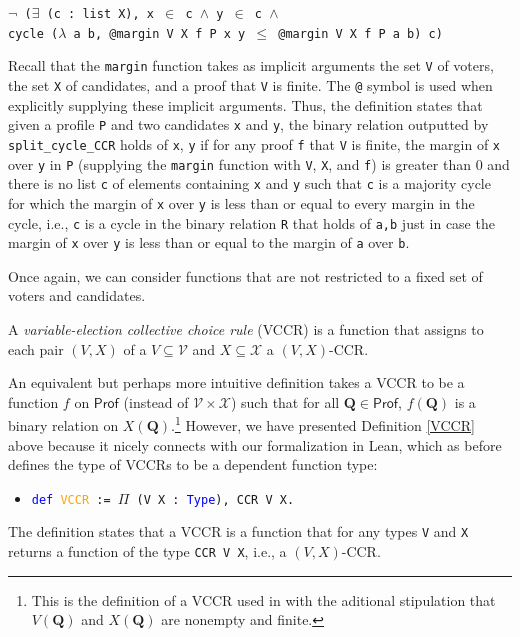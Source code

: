 \documentclass[runningheads]{llncs}
\begin{document}
\begin{example}
\begin{itemize}
    \texttt{$\neg$ ($\exists$ (c : list X), x $\in$ c $\wedge$ y $\in$ c $\wedge$}\\
    \texttt{cycle ($\lambda$ a b, @margin V X f P x y $\leq$ @margin V X f P a b) c)}
\end{itemize}
Recall that the \texttt{margin} function takes as implicit arguments the set \texttt{V} of voters, the set \texttt{X} of candidates, and a proof that \texttt{V} is finite. The \texttt{@} symbol is used when explicitly supplying these implicit arguments. Thus, the definition states that given a profile \texttt{P} and two candidates \texttt{x} and \texttt{y}, the binary relation outputted by \texttt{split\_cycle\_CCR} holds of \texttt{x}, \texttt{y} if for any proof \texttt{f} that \texttt{V} is finite, the margin of \texttt{x} over \texttt{y} in \texttt{P} (supplying the \texttt{margin} function with \texttt{V}, \texttt{X}, and \texttt{f}) is greater than 0 and there is no list \texttt{c} of elements containing \texttt{x} and \texttt{y} such that \texttt{c} is a majority cycle for which the margin of \texttt{x} over \texttt{y} is less than or equal to every margin in the cycle, i.e., \texttt{c} is a cycle in the binary relation \texttt{R} that holds of \texttt{a,b} just in case the margin of \texttt{x} over \texttt{y} is less than or equal to the margin of \texttt{a} over \texttt{b}.

\end{example}

Once again, we can consider functions that are not restricted to a fixed set of voters and candidates.

\begin{definition}\label{VCCR} \textnormal{A \emph{variable-election collective choice rule} (VCCR) is a function that assigns to each pair $(V,X)$ of a $V\subseteq\mathcal{V}$ and $X\subseteq\mathcal{X}$ a $(V,X)$-CCR.}%
\end{definition}

\noindent An equivalent but perhaps more intuitive definition takes a VCCR to be a function $f$ on $\mathsf{Prof}$ (instead of $\mathcal{V}\times\mathcal{X}$) such that for all $\mathbf{Q}\in\mathsf{Prof}$, $f(\mathbf{Q})$ is a binary relation on $X(\mathbf{Q})$.\footnote{This is the definition of a VCCR used in \cite{HP2020} with the aditional stipulation that $V(\mathbf{Q})$ and $X(\mathbf{Q})$ are nonempty and finite.} However, we have presented Definition \ref{VCCR} above because it nicely connects with our formalization in Lean, which as before defines the type of VCCRs to be a dependent function type:
\begin{itemize}
\item[] \texttt{\textcolor{blue}{def} \textcolor{orange}{VCCR} := $\Pi$ (V X : \textcolor{blue}{Type}), CCR V X.}
\end{itemize}
The definition states that a VCCR is a function that for any types \texttt{V} and \texttt{X} returns a function of the type \texttt{CCR V X}, i.e., a $(V,X)$-CCR.
\end{document}
